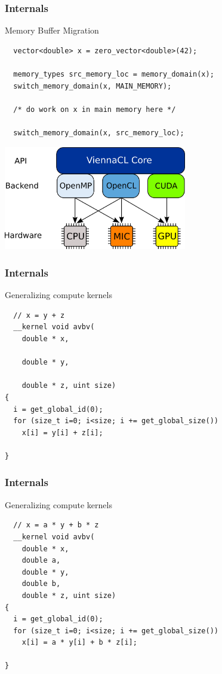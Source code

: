 \begin{frame}[fragile]
\frametitle{Internals}

 \begin{block}{Memory Buffer Migration}
  \begin{lstlisting}
  vector<double> x = zero_vector<double>(42);

  memory_types src_memory_loc = memory_domain(x);
  switch_memory_domain(x, MAIN_MEMORY);

  /* do work on x in main memory here */

  switch_memory_domain(x, src_memory_loc);
\end{lstlisting}

  \begin{center}
    \includegraphics[width=0.6\textwidth]{figures/ViennaCL-arch.png}
  \end{center}
 \end{block}

\end{frame}




\begin{frame}[fragile]
\frametitle{Internals}

 \begin{block}{Generalizing compute kernels}
  \begin{lstlisting}
  // x = y + z
  __kernel void avbv(
    double * x,

    double * y,

    double * z, uint size)
{
  i = get_global_id(0);
  for (size_t i=0; i<size; i += get_global_size())
    x[i] = y[i] + z[i]; 

}
  \end{lstlisting}
 \end{block}

 \vspace*{1.5cm}
\end{frame}



\begin{frame}[fragile]
\frametitle{Internals}

 \begin{block}{Generalizing compute kernels}
  \begin{lstlisting}
  // x = a * y + b * z
  __kernel void avbv(
    double * x,
    double a,
    double * y,
    double b,
    double * z, uint size)
{
  i = get_global_id(0);
  for (size_t i=0; i<size; i += get_global_size())
    x[i] = a * y[i] + b * z[i]; 

}
  \end{lstlisting}
 \end{block}

 \vspace*{1.5cm}
\end{frame}


